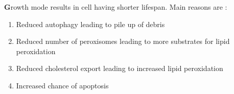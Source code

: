 \textbf Growth mode results in cell having shorter lifespan. Main reasons are :
\begin{enumerate}
\item Reduced autophagy leading to pile up of debris
\item Reduced number of peroxisomes leading to more substrates for lipid peroxidation
\item Reduced cholesterol export leading to increased lipid peroxidation
\item Increased chance of apoptosis
\end{enumerate}